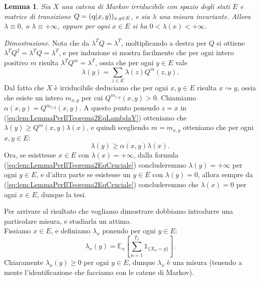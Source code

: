 \documentclass[11pt]{book}
\makeatletter
\theoremstyle{Definizione}
\theoremstyle{TeoremaProposizioneLemmaCorollario}
\newtheorem{mylem}[myteo]{Lemma}
\theoremstyle{OsservazioneNota}
\renewenvironment{proof}[1][\proofname]{\par
  \normalfont \topsep6\p@\@plus6\p@\relax
  \trivlist
  \item[\hskip\labelsep
        \itshape
    #1\@addpunct{.}]\ignorespaces
}{%
  \endtrivlist\@endpefalse
}
\newcommand{\E}{\mathbb{E}}
\newcommand{\conduce}{\rightsquigarrow}
\newcommand{\q}{\textup{q}}
\newcommand{\uno}[1]{\mathds{1}_{#1}}
\renewenvironment{proof}{\textsl{Dimostrazione}.}{}
\makeatother
\begin{document}
\begin{boxoss}
\begin{mylem}\label{lem:LemmaPreTeorema2}
Sia $X$ una catena di Markov irriducibile con spazio degli stati $E$ e matrice di transizione $Q = (\q(x,y))_{x,y\in E}$, e sia $\lambda$ una misura invariante. Allora $\lambda \equiv 0$, o $\lambda \equiv +\infty$, oppure per ogni $x\in E$ si ha $0 < \lambda(x) < +\infty$.
\end{mylem}
\tcblower
\begin{proof}
Nota che da $\lambda^T Q = \lambda^T$, moltiplicando a destra per $Q$ si ottiene $\lambda^T Q^2 = \lambda^T Q = \lambda^T$, e per induzione si mostra facilmente che per ogni intero positivo $m$ risulta $\lambda^T Q^m = \lambda^T$, ossia che per ogni $y\in E$ vale
\begin{equation}\label{eq:lem:LemmaPerIlTeorema2EqLambdaY}
\lambda(y) = \sum_{z\in E} \lambda(z)Q^m(z,y).
\end{equation}
Dal fatto che $X$ è irriducibile deduciamo che per ogni $x,y\in E$ risulta $x \conduce y$, ossia che esiste un intero $m_{x,y}$ per cui $Q^{m_{x,y}}(x,y) > 0$. Chiamiamo $\alpha(x,y) = Q^{m_{x,y}}(x,y)$. A questo punto ponendo $ z = x$ in (\ref{eq:lem:LemmaPerIlTeorema2EqLambdaY}) otteniamo che $\lambda(y) \geq Q^m(x,y) \lambda(x)$, e quindi scegliendo $m = m_{x,y}$ otteniamo che per ogni $x,y\in E$:
\begin{equation}\label{eq:lem:LemmaPerIlTeorema2EqCruciale}
\lambda(y) \geq \alpha(x,y)\lambda(x).
\end{equation}
Ora, se esisttesse $x\in E$ con $\lambda(x) = +\infty$, dalla formula (\ref{eq:lem:LemmaPerIlTeorema2EqCruciale}) concluderemmo $\lambda(y) = +\infty$ per ogni $y\in E$, e d'altra parte se esistesse un $y\in E$ con $\lambda(y) = 0$, allora sempre da (\ref{eq:lem:LemmaPerIlTeorema2EqCruciale}) concluderemmo che $\lambda(x) = 0$ per ogni $x\in E$, dunque la tesi.
\end{proof}
\end{boxoss}
\noindent
Per arrivare al risultato che vogliamo dimostrare dobbiamo introdurre una particolare misura, e studiarla un attimo.\\
Fissiamo $x\in E$, e definiamo $\lambda_x$ ponendo per ogni $y\in E$:
\begin{equation}\label{eq:DefinizioneLambdaX}
\lambda_x(y) = \E_x\left[\sum_{n = 1}^{T_x} \uno{\{X_n = y\}}\right].
\end{equation}
Chiaramente $\lambda_x(y) \geq 0$ per ogni $y\in E$, dunque $\lambda_x$ è una misura (tenendo a mente l'identificazione che facciamo con le catene di Markov).\\
\end{document}
